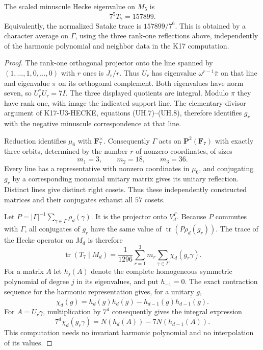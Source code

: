 \begin{theorem}[KT-U3-SECOND]
The scaled minuscule Hecke eigenvalue on $M_5$ is
\[
                         7^5T_7=157899.
\]
Equivalently, the normalized Satake trace is $157899/7^6$.
This is obtained by a character average on $\Gamma$, using the
three rank-one reflections above, independently of the harmonic
polynomial and neighbor data in the K17 computation.
\end{theorem}
\begin{proof}
The rank-one orthogonal projector onto the line spanned by
$(1,\ldots,1,0,\ldots,0)$ with $r$ ones is $J_r/r$.
Thus $U_r$ has eigenvalue $\omega^{r-1}\bar\pi$ on that line
and eigenvalue $\pi$ on its orthogonal complement.
Both eigenvalues have norm seven, so $U_r^*U_r=7I$.
The three displayed quotients are integral. Modulo $\pi$ they
have rank one, with image the indicated support line.
The elementary-divisor argument of K17-U3-HECKE, equations
(UH.7)--(UH.8), therefore identifies $g_r$ with the negative
minuscule correspondence at that line.

Reduction identifies $\mu_6$ with $\mathbf F_7^\times$.
Consequently $\Gamma$ acts on $\mathbf P^2(\mathbf F_7)$ with
exactly three orbits, determined by the number $r$ of nonzero
coordinates, of sizes
\[
             m_1=3,\qquad m_2=18,\qquad m_3=36.
\]
Every line has a representative with nonzero coordinates in
$\mu_6$, and conjugating $g_r$ by a corresponding monomial
unitary matrix gives its unitary reflection.
Distinct lines give distinct right cosets. Thus these independently
constructed matrices and their conjugates exhaust all $57$ cosets.

Let $P=|\Gamma|^{-1}\sum_{\gamma\in\Gamma}\rho_d(\gamma)$.
It is the projector onto $V_d^\Gamma$.
Because $P$ commutes with $\Gamma$, all conjugates of $g_r$ have
the same value of $\operatorname{tr}(P\rho_d(g_r))$.
The trace of the Hecke operator on $M_d$ is therefore
\[
 \operatorname{tr}(T_7\mid M_d)=
 \frac1{1296}\sum_{r=1}^3m_r
       \sum_{\gamma\in\Gamma}\chi_d(g_r\gamma).
\]
For a matrix $A$ let $h_j(A)$ denote the complete homogeneous
symmetric polynomial of degree $j$ in its eigenvalues, and put
$h_{-1}=0$.
The exact contraction sequence for the harmonic representation gives,
for a unitary $g$,
\[
 \chi_d(g)=h_d(g)\overline{h_d(g)}
                 -h_{d-1}(g)\overline{h_{d-1}(g)}.
\]
For $A=U_r\gamma$, multiplication by $7^d$ consequently gives
the integral expression
\[
       7^d\chi_d(g_r\gamma)
           =N(h_d(A))-7N(h_{d-1}(A)).                 \tag{KT-U.1}
\]
This computation needs no invariant harmonic polynomial and no
interpolation of its values.


\end{proof}
